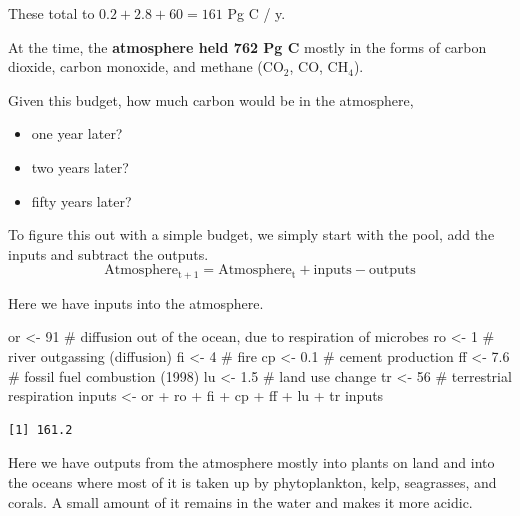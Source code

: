 \documentclass[
  letterpaper,
  DIV=11,
  numbers=noendperiod]{scrreprt}
\newenvironment{Shaded}{\begin{snugshade}}{\end{snugshade}}
\newcommand{\CommentTok}[1]{\textcolor[rgb]{0.37,0.37,0.37}{#1}}
\newcommand{\DecValTok}[1]{\textcolor[rgb]{0.68,0.00,0.00}{#1}}
\newcommand{\FloatTok}[1]{\textcolor[rgb]{0.68,0.00,0.00}{#1}}
\newcommand{\NormalTok}[1]{\textcolor[rgb]{0.00,0.23,0.31}{#1}}
\newcommand{\OtherTok}[1]{\textcolor[rgb]{0.00,0.23,0.31}{#1}}
\newcommand{\SpecialCharTok}[1]{\textcolor[rgb]{0.37,0.37,0.37}{#1}}
\providecommand{\tightlist}{%
  \setlength{\itemsep}{0pt}\setlength{\parskip}{0pt}}
\begin{document}
These total to \(0.2 +2.8+60=161\) Pg C / y.

At the time, the \textbf{atmosphere held 762 Pg C} mostly in the forms
of carbon dioxide, carbon monoxide, and methane (CO\(_2\), CO,
CH\(_4\)).

Given this budget, how much carbon would be in the atmosphere,

\begin{itemize}
\tightlist
\item
  one year later?
\item
  two years later?
\item
  fifty years later?
\end{itemize}

To figure this out with a simple budget, we simply start with the pool,
add the inputs and subtract the outputs.
\[\mathrm{Atmosphere_{t+1}} = \mathrm{Atmosphere_{t}} + \mathrm{inputs} -  \mathrm{outputs}\]

Here we have inputs into the atmosphere.

\begin{Shaded}
\begin{Highlighting}[]
\NormalTok{or }\OtherTok{\textless{}{-}} \DecValTok{91} \CommentTok{\# diffusion out of the ocean, due to respiration of microbes}
\NormalTok{ro }\OtherTok{\textless{}{-}} \DecValTok{1} \CommentTok{\# river outgassing (diffusion)}
\NormalTok{fi }\OtherTok{\textless{}{-}} \DecValTok{4} \CommentTok{\# fire}
\NormalTok{cp }\OtherTok{\textless{}{-}} \FloatTok{0.1} \CommentTok{\# cement production}
\NormalTok{ff }\OtherTok{\textless{}{-}} \FloatTok{7.6} \CommentTok{\# fossil fuel combustion (1998) }
\NormalTok{lu }\OtherTok{\textless{}{-}} \FloatTok{1.5} \CommentTok{\# land use change }
\NormalTok{tr }\OtherTok{\textless{}{-}} \DecValTok{56} \CommentTok{\# terrestrial respiration}
\NormalTok{inputs }\OtherTok{\textless{}{-}}\NormalTok{ or }\SpecialCharTok{+}\NormalTok{ ro }\SpecialCharTok{+}\NormalTok{ fi }\SpecialCharTok{+}\NormalTok{ cp }\SpecialCharTok{+}\NormalTok{ ff }\SpecialCharTok{+}\NormalTok{ lu }\SpecialCharTok{+}\NormalTok{ tr}
\NormalTok{inputs}
\end{Highlighting}
\end{Shaded}

\begin{verbatim}
[1] 161.2
\end{verbatim}

Here we have outputs from the atmosphere mostly into plants on land and
into the oceans where most of it is taken up by phytoplankton, kelp,
seagrasses, and corals. A small amount of it remains in the water and
makes it more acidic.
\end{document}
